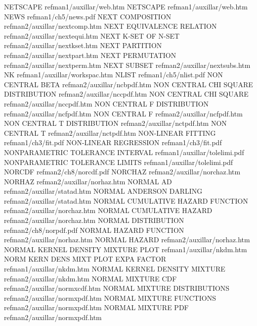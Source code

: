 NETSCAPE                                refman1/auxillar/web.htm
NETSCAPE                                refman1/auxillar/web.htm
NEWS                                    refman1/ch5/news.pdf
NEXT COMPOSITION                        refman2/auxillar/nextcomp.htm
NEXT EQUIVALENCE RELATION               refman2/auxillar/nextequi.htm
NEXT K-SET OF N-SET                     refman2/auxillar/nextkset.htm
NEXT PARTITION                          refman2/auxillar/nextpart.htm
NEXT PERMUTATION                        refman2/auxillar/nextperm.htm
NEXT SUBSET                             refman2/auxillar/nextsubs.htm
NK                                      refman1/auxillar/workspac.htm
NLIST                                   refman1/ch5/nlist.pdf
NON CENTRAL BETA                        refman2/auxillar/ncbpdf.htm
NON CENTRAL CHI SQUARE DISTRIBUTION     refman2/auxillar/nccpdf.htm
NON CENTRAL CHI SQUARE                  refman2/auxillar/nccpdf.htm
NON CENTRAL F DISTRIBUTION              refman2/auxillar/ncfpdf.htm
NON CENTRAL F                           refman2/auxillar/ncfpdf.htm
NON CENTRAL T DISTRIBUTION              refman2/auxillar/nctpdf.htm
NON CENTRAL T                           refman2/auxillar/nctpdf.htm
NON-LINEAR FITTING                      refman1/ch3/fit.pdf
NON-LINEAR REGRESSION                   refman1/ch3/fit.pdf
NONPARAMETRIC TOLERANCE INTERVAL        refman1/auxillar/tolelimi.pdf
NONPARAMETRIC TOLERANCE LIMITS          refman1/auxillar/tolelimi.pdf
NORCDF                                  refman2/ch8/norcdf.pdf
NORCHAZ                                 refman2/auxillar/norchaz.htm
NORHAZ                                  refman2/auxillar/norhaz.htm
NORMAL AD                               refman2/auxillar/statad.htm
NORMAL ANDERSON DARLING                 refman2/auxillar/statad.htm
NORMAL CUMULATIVE HAZARD FUNCTION       refman2/auxillar/norchaz.htm
NORMAL CUMULATIVE HAZARD                refman2/auxillar/norchaz.htm
NORMAL DISTRIBUTION                     refman2/ch8/norpdf.pdf
NORMAL HAZARD FUNCTION                  refman2/auxillar/norhaz.htm
NORMAL HAZARD                           refman2/auxillar/norhaz.htm
NORMAL KERNEL DENSITY MIXTURE PLOT      refman1/auxillar/nkdm.htm
NORM KERN DENS MIXT PLOT EXPA FACTOR    refman1/auxillar/nkdm.htm
NORMAL KERNEL DENSITY MIXTURE           refman2/auxillar/nkdm.htm
NORMAL MIXTURE CDF                      refman2/auxillar/normxcdf.htm
NORMAL MIXTURE DISTRIBUTIONS            refman2/auxillar/normxpdf.htm
NORMAL MIXTURE FUNCTIONS                refman2/auxillar/normxpdf.htm
NORMAL MIXTURE PDF                      refman2/auxillar/normxpdf.htm
